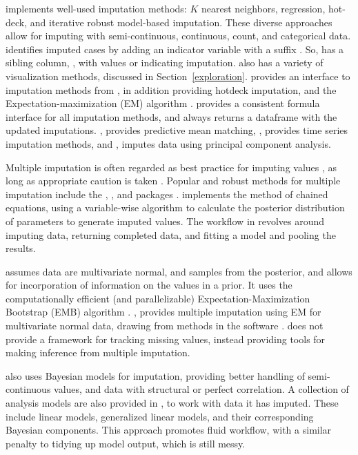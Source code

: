 \documentclass[article]{jss}
\begin{document}
 \citep{VIM} implements well-used imputation methods: $K$ nearest
neighbors, regression, hot-deck, and iterative robust model-based
imputation.  These diverse approaches allow for imputing with
semi-continuous, continuous, count, and categorical data.   identifies
imputed cases by adding an indicator variable with a suffix .
So,  has a sibling column, , with values
 or  indicating imputation.   also has a variety of
visualization methods, discussed in Section~\ref{exploration}.
 provides an interface to imputation methods from
, in addition providing hotdeck imputation, and the
Expectation-maximization (EM) algorithm
\citep{simputation, Dempster1977}.   provides a consistent
formula interface for all imputation methods, and always returns a dataframe
with the updated imputations.   \citep{Hmisc}, provides
predictive mean matching,  \citep{imputeTS}, provides time
series imputation methods, and  \citep{missMDA}, imputes data
using principal component analysis.

Multiple imputation is often regarded as best practice for imputing values
\citep{Schafer2002}, as long as appropriate caution is taken
\citep{Sterne2009}.  Popular and robust methods for multiple imputation
include the , , and  packages \citep{mice,
amelia, mi}.   implements the method of chained equations, using a
variable-wise algorithm to calculate the posterior distribution of
parameters to generate imputed values.  The workflow in  revolves
around imputing data, returning completed data, and fitting a model and
pooling the results.

 \citep{amelia} assumes data are multivariate normal, and
samples from the posterior, and allows for incorporation of information on
the values in a prior.  It uses the computationally efficient (and
parallelizable) Expectation-Maximization Bootstrap (EMB) algorithm
\citep{Honaker2010}.   \citep{norm}, provides multiple imputation
using EM for multivariate normal data, drawing from methods in the
 software \citep{schafer-norm}.   does not provide
a framework for tracking missing values, instead providing tools for making
inference from multiple imputation.

 \citep{mi} also uses Bayesian models for imputation, providing
better handling of semi-continuous values, and data with structural or
perfect correlation.  A collection of analysis models are also provided in
, to work with data it has imputed.  These include linear models,
generalized linear models, and their corresponding Bayesian components.
This approach promotes fluid workflow, with a similar penalty to tidying up
model output, which is still messy.
\end{document}
